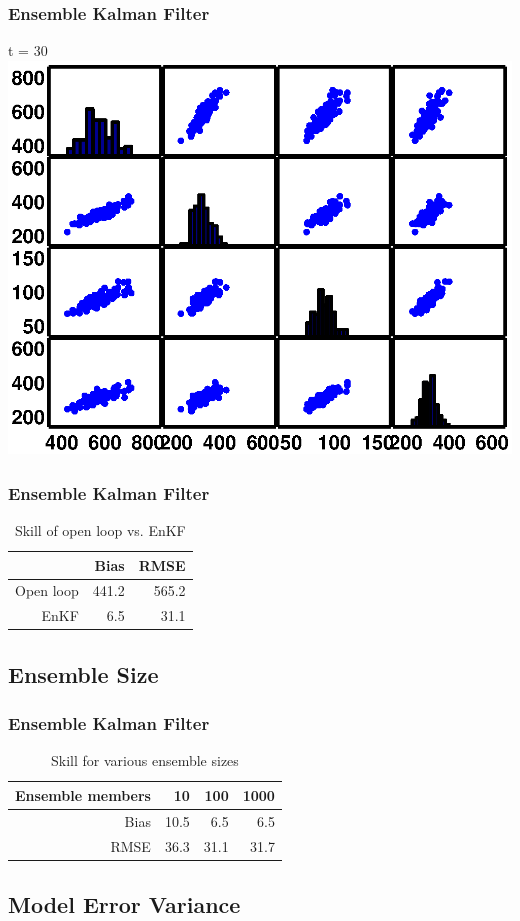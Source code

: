 \documentclass[mathserif]{beamer}
\begin{document}
\begin{frame}
\begin{center}
\frametitle{Ensemble Kalman Filter}
t = 30
\includegraphics[width=1\textwidth]{kf30cov}
\end{center}
\end{frame}

\begin{frame}
\begin{center}
\frametitle{Ensemble Kalman Filter}
\begin{table}
\begin{tabular}{rrr}
& Bias & RMSE \\
\hline
Open loop & 441.2 & 565.2 \\
EnKF & 6.5 & 31.1
\end{tabular}
\caption{Skill of open loop vs. EnKF}
\end{table}
\end{center}
\end{frame}

\subsection{Ensemble Size}

\begin{frame}
\begin{center}
\frametitle{Ensemble Kalman Filter}
\begin{table}
\begin{tabular}{rrrr}
Ensemble members & 10 & 100 & 1000 \\
\hline
Bias & 10.5 & 6.5 & 6.5 \\
RMSE & 36.3 & 31.1 & 31.7
\end{tabular}
\caption{Skill for various ensemble sizes}
\end{table}
\end{center}
\end{frame}

\subsection{Model Error Variance}

%
%
\end{document}
